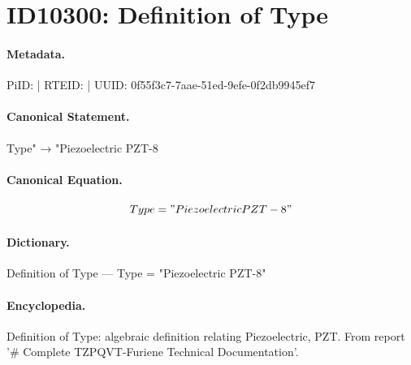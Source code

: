 \section*{ID10300: Definition of Type}
\paragraph{Metadata.}
PiID:  | RTEID:  | UUID: 0f55f3c7-7aae-51ed-9efe-0f2db9945ef7

\paragraph{Canonical Statement.}
Type" → "Piezoelectric PZT-8

\paragraph{Canonical Equation.}
\[
Type = "Piezoelectric PZT-8"
\]

\paragraph{Dictionary.}
Definition of Type — Type = "Piezoelectric PZT-8"

\paragraph{Encyclopedia.}
Definition of Type: algebraic definition relating Piezoelectric, PZT. From report '\# Complete TZPQVT-Furiene Technical Documentation'.
